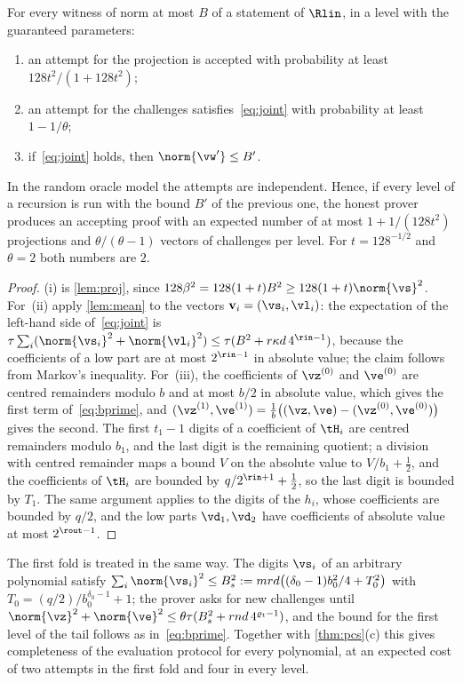 \begin{theorem}\label{thm:complete}
For every witness of norm at most $B$ of a statement of $\Rlin$, in a level with the guaranteed parameters:
\begin{enumerate}[label=(\roman*)]
\item an attempt for the projection is accepted with probability at least $128t^2/(1+128t^2)$;
\item an attempt for the challenges satisfies~\eqref{eq:joint} with probability at least $1-1/\theta$;
\item if~\eqref{eq:joint} holds, then $\norm{\vw'}\le B'$.
\end{enumerate}
In the random oracle model the attempts are independent. Hence, if every level of a recursion is run with the bound $B'$ of the previous one, the honest prover produces an accepting proof with an expected number of at most $1+1/(128t^2)$ projections and $\theta/(\theta-1)$ vectors of challenges per level. For $t=128^{-1/2}$ and $\theta=2$ both numbers are $2$.
\end{theorem}
\begin{proof}
(i) is \cref{lem:proj}, since $128\beta^2=128(1+t)B^2\ge128(1+t)\norm{\vs}^2$. For~(ii) apply \cref{lem:mean} to the vectors $\mathbf v_i=(\vs_i,\vl_i)$: the expectation of the left-hand side of~\eqref{eq:joint} is $\tau\sum_i(\norm{\vs_i}^2+\norm{\vl_i}^2)\le\tau(B^2+r\kappa d\,4^{\rin-1})$, because the coefficients of a low part are at most $2^{\rin-1}$ in absolute value; the claim follows from Markov's inequality. For~(iii), the coefficients of $\vz^{(0)}$ and $\ve^{(0)}$ are centred remainders modulo $b$ and at most $b/2$ in absolute value, which gives the first term of~\eqref{eq:bprime}, and $(\vz^{(1)},\ve^{(1)})=\frac1b\bigl((\vz,\ve)-(\vz^{(0)},\ve^{(0)})\bigr)$ gives the second. The first $t_1-1$ digits of a coefficient of $\tH_i$ are centred remainders modulo $b_1$, and the last digit is the remaining quotient; a division with centred remainder maps a bound $V$ on the absolute value to $V/b_1+\frac12$, and the coefficients of $\tH_i$ are bounded by $q/2^{\rin+1}+\frac12$, so the last digit is bounded by $T_1$. The same argument applies to the digits of the $h_i$, whose coefficients are bounded by $q/2$, and the low parts $\vd_1,\vd_2$ have coefficients of absolute value at most $2^{\rout-1}$.
\end{proof}

The first fold is treated in the same way. The digits $\vs_i$ of an arbitrary polynomial satisfy $\sum_i\norm{\vs_i}^2\le B_s^2:=mrd\bigl((\delta_0-1)b_0^2/4+T_0^2\bigr)$ with $T_0=(q/2)/b_0^{\delta_0-1}+1$; the prover asks for new challenges until $\norm{\vz}^2+\norm{\ve}^2\le\theta\tau(B_s^2+rnd\,4^{\varrho_t-1})$, and the bound for the first level of the tail follows as in~\eqref{eq:bprime}. Together with \cref{thm:pcs}(c) this gives completeness of the evaluation protocol for every polynomial, at an expected cost of two attempts in the first fold and four in every level.

